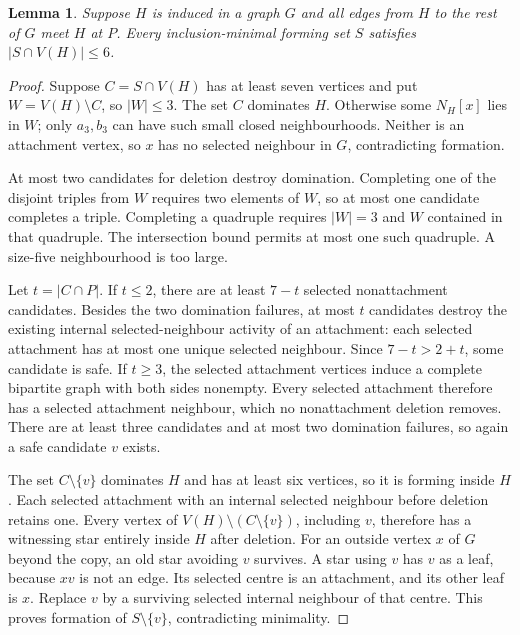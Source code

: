 \documentclass[11pt]{article}
\newtheorem{lemma}[theorem]{Lemma}
\begin{document}
\begin{lemma}\label{lem:localcap}
Suppose $H$ is induced in a graph $G$ and all edges from $H$ to the rest
of $G$ meet $H$ at $P$. Every inclusion-minimal forming set $S$ satisfies
$|S\cap V(H)|\le6$.
\end{lemma}
\begin{proof}
Suppose $C=S\cap V(H)$ has at least seven vertices and put
$W=V(H)\setminus C$, so $|W|\le3$. The set $C$ dominates $H$.
Otherwise some $N_H[x]$ lies in $W$; only $a_3,b_3$ can have such small
closed neighbourhoods. Neither is an attachment vertex, so $x$ has no
selected neighbour in $G$, contradicting formation.

At most two candidates for deletion destroy domination. Completing one
of the disjoint triples from $W$ requires two elements of $W$, so at
most one candidate completes a triple. Completing a quadruple requires
$|W|=3$ and $W$ contained in that quadruple. The intersection bound
permits at most one such quadruple. A size-five neighbourhood is too large.

Let $t=|C\cap P|$. If $t\le2$, there are at least $7-t$ selected
nonattachment candidates. Besides the two domination failures, at most
$t$ candidates destroy the existing internal selected-neighbour activity
of an attachment: each selected attachment has at most one unique selected
neighbour. Since $7-t>2+t$, some candidate is safe. If $t\ge3$, the
selected attachment vertices induce a complete bipartite graph with both
sides nonempty. Every selected attachment therefore has a selected
attachment neighbour, which no nonattachment deletion removes. There
are at least three candidates and at most two domination failures, so
again a safe candidate $v$ exists.

The set $C\setminus\{v\}$ dominates $H$ and has at least six vertices,
so it is forming inside $H$. Each selected attachment with an internal
selected neighbour before deletion retains one. Every vertex of
$V(H)\setminus(C\setminus\{v\})$, including $v$, therefore has a
witnessing star entirely inside $H$ after deletion. For an
outside vertex $x$ of $G$ beyond the copy, an old star avoiding $v$
survives. A star using $v$ has $v$ as a leaf, because $xv$ is not an
edge. Its selected centre is an attachment, and its other leaf is $x$.
Replace $v$ by a surviving selected internal neighbour of that centre.
This proves formation of $S\setminus\{v\}$, contradicting minimality.
\end{proof}
\end{document}

